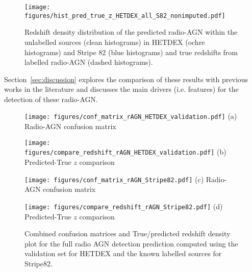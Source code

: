 \documentclass{aa}
\begin{document}
\begin{figure}
  \centering
    \texttt{[image: figures/hist\_pred\_true\_z\_HETDEX\_all\_S82\_nonimputed.pdf]}
  \caption{Redshift density distribution of the predicted radio-AGN within the unlabelled sources (clean histograms) in HETDEX (ochre histograms) and Stripe 82 (blue histograms) and true redshifts from labelled radio-AGN (dashed histograms).}
  \label{fig:hist_pred_z_unlabel_true_z_label}
\end{figure}

Section~\ref{sec:discussion} explores the comparison of these results with previous works in the literature and discusses the main drivers (i.e. features) for the detection of these radio-AGN.

\begin{figure*}
  \centering
  \begin{minipage}{0.20\textwidth}
    \centering
    \texttt{[image: figures/conf\_matrix\_rAGN\_HETDEX\_validation.pdf]}\hfill\break
    {(a) Radio-AGN confusion matrix}
  \end{minipage}%
      \centering
  \begin{minipage}{0.30\textwidth}
    \centering
    \texttt{[image: figures/compare\_redshift\_rAGN\_HETDEX\_validation.pdf]}\hfill\break
    {(b) Predicted-True $z$ comparison}
  \end{minipage}%
  \begin{minipage}{0.20\textwidth}
    \centering
    \texttt{[image: figures/conf\_matrix\_rAGN\_Stripe82.pdf]}\hfill\break
    {(c) Radio-AGN confusion matrix}
  \end{minipage}%
  \begin{minipage}{0.30\textwidth}
    \centering
    \texttt{[image: figures/compare\_redshift\_rAGN\_Stripe82.pdf]}\hfill\break
    {(d) Predicted-True $z$ comparison}
  \end{minipage}%
  \caption{Combined confusion matrices and True/predicted redshift density plot for the full radio AGN detection prediction computed using the validation set for HETDEX and the known labelled sources for Stripe82.
  }
  \label{fig:conf_matx_results_radio_AGN}
\end{figure*}
\end{document}

